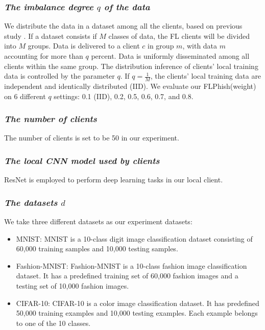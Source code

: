 \documentclass[lettersize,journal]{IEEEtran}
\begin{document}
  \subsubsection{{\textit{The imbalance degree {$q$} of the data}}} We distribute the data in a dataset among all the clients, based on previous study \cite{ref_06_model}. If a dataset consists if $M$ classes of data, the FL clients will be divided into $M$ groups. Data is delivered to a client $c$ in group $m$, with data $m$ accounting for more than $q$ percent. Data is uniformly disseminated among all clients within the same group. The distribution inference of clients' local training data is controlled by the parameter $q$. If $q=\frac{1}{M}$, the clients' local training data are independent and identically distributed (IID). We evaluate our FLPhish(weight) on 6 different $q$ settings: 0.1 (IID), 0.2, 0.5, 0.6, 0.7, and 0.8.
  \subsubsection{{\textit{The number of clients}}} The number of clients is set to be 50 in our experiment.
  \subsubsection{{\textit{The local CNN model used by clients}}} ResNet is employed to perform deep learning tasks in our local client.
  \subsubsection{{\textit{The datasets {$d$}}}} We take three different datasets as our experiment datasets: \begin{itemize}
      \item MNIST: MNIST is a 10-class digit image classification dataset consisting of 60,000 training samples and 10,000 testing samples.
      \item Fashion-MNIST: Fashion-MNIST is a 10-class fashion image classification dataset. It has a predefined training set of 60,000 fashion images and a testing set of 10,000 fashion images.
      \item CIFAR-10: CIFAR-10 is a color image classification dataset. It has predefined 50,000 training examples and 10,000 testing examples. Each example belongs to one of the 10 classes.
  \end{itemize} 
\end{document}
